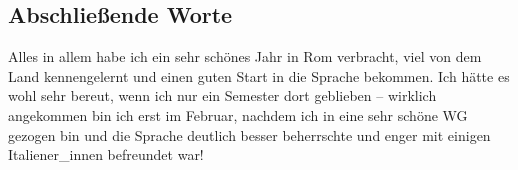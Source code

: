 \documentclass[a4paper,12pt]{article}
\begin{document}
\subsection*{Abschließende Worte}
Alles in allem habe ich ein sehr schönes Jahr in Rom verbracht, viel von dem Land kennengelernt und einen guten Start in die Sprache bekommen. Ich hätte es wohl sehr bereut, wenn ich nur ein Semester dort geblieben – wirklich angekommen bin ich erst im Februar, nachdem ich in eine sehr schöne WG gezogen bin und die Sprache deutlich besser beherrschte und enger mit einigen Italiener\_innen befreundet war!
\end{document}
